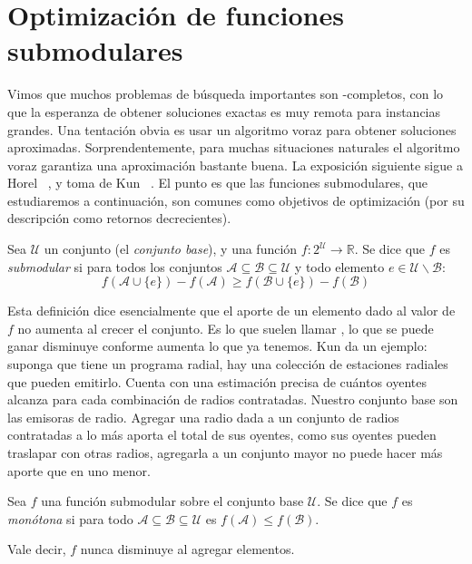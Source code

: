 

\chapter{Optimización de funciones submodulares}
\label{cha:optimizacion-submodulares}

  Vimos que muchos problemas de búsqueda importantes
  son \NP\nobreakdash-completos,
  con lo que la esperanza de obtener soluciones exactas es muy remota
  para instancias grandes.
  Una tentación obvia es usar un algoritmo voraz
  para obtener soluciones aproximadas.
  Sorprendentemente,
  para muchas situaciones naturales el algoritmo voraz
  garantiza una aproximación bastante buena.
  La exposición siguiente sigue a Horel~%
    \cite{horel15:_notes_greedy_algo_submodular},
  y toma de Kun~%
    \cite{kun14:_greedy_algo_good_enough}.
  El punto es que las funciones submodulares,
  que estudiaremos a continuación,
  son comunes como objetivos de optimización
  (por su descripción como retornos decrecientes).
  \begin{definition}
    \label{def:submodular}
    Sea \(\mathscr{U}\) un conjunto
    (el \emph{conjunto base}),
    y una función \(f \colon 2^{\mathscr{U}} \to \mathbb{R}\).
    Se dice que \(f\) es \emph{submodular} si para todos los conjuntos
    \(\mathscr{A} \subseteq \mathscr{B} \subseteq \mathscr{U}\)
    y todo elemento \(e \in \mathscr{U} \smallsetminus \mathscr{B}\):
    \begin{equation}
      \label{eq:submodular-def}
      f(\mathscr{A} \cup \{ e \}) - f(\mathscr{A})
        \ge f(\mathscr{B} \cup \{ e \}) - f(\mathscr{B})
    \end{equation}
  \end{definition}
  Esta definición dice esencialmente
  que el aporte de un elemento dado al valor de \(f\)
  no aumenta al crecer el conjunto.
  Es lo que suelen llamar ,
  lo que se puede ganar disminuye conforme aumenta lo que ya tenemos.
  Kun da un ejemplo:
  suponga que tiene un programa radial,
  hay una colección de estaciones radiales que pueden emitirlo.
  Cuenta con una estimación precisa de cuántos oyentes alcanza
  para cada combinación de radios contratadas.
  Nuestro conjunto base son las emisoras de radio.
  Agregar una radio dada a un conjunto de radios contratadas
  a lo más aporta el total de sus oyentes,
  como sus oyentes pueden traslapar con otras radios,
  agregarla a un conjunto mayor no puede hacer más aporte que en uno menor.
  \begin{definition}
    \label{def:submodular-monotone}
    Sea \(f\) una función submodular sobre el conjunto base \(\mathscr{U}\).
    Se dice que \(f\) es \emph{monótona}
    si para todo \(\mathscr{A} \subseteq \mathscr{B} \subseteq \mathscr{U}\)
    es \(f(\mathscr{A}) \le f(\mathscr{B})\).
  \end{definition}
  Vale decir,
  \(f\) nunca disminuye al agregar elementos.

